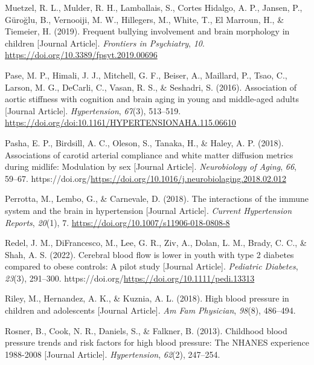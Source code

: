 \documentclass[
  letterpaper,
  DIV=11,
  numbers=noendperiod]{scrreport}
\newlength{\cslhangindent}
\newenvironment{CSLReferences}[2] %
 {\begin{list}{}{%
  \setlength{\itemindent}{0pt}
  \setlength{\leftmargin}{0pt}
  \setlength{\parsep}{0pt}
  \ifodd #1
   \setlength{\leftmargin}{\cslhangindent}
   \setlength{\itemindent}{-1\cslhangindent}
  \fi
  \setlength{\itemsep}{#2\baselineskip}}}
 {\end{list}}
\begin{document}
\begin{CSLReferences}{1}{0}
Muetzel, R. L., Mulder, R. H., Lamballais, S., Cortes Hidalgo, A. P.,
Jansen, P., Güroğlu, B., Vernooiji, M. W., Hillegers, M., White, T., El
Marroun, H., \& Tiemeier, H. (2019). Frequent bullying involvement and
brain morphology in children {[}Journal Article{]}. \emph{Frontiers in
Psychiatry}, \emph{10}. \url{https://doi.org/10.3389/fpsyt.2019.00696}

Pase, M. P., Himali, J. J., Mitchell, G. F., Beiser, A., Maillard, P.,
Tsao, C., Larson, M. G., DeCarli, C., Vasan, R. S., \& Seshadri, S.
(2016). Association of aortic stiffness with cognition and brain aging
in young and middle-aged adults {[}Journal Article{]}.
\emph{Hypertension}, \emph{67}(3), 513--519.
\url{https://doi.org/doi:10.1161/HYPERTENSIONAHA.115.06610}

Pasha, E. P., Birdsill, A. C., Oleson, S., Tanaka, H., \& Haley, A. P.
(2018). Associations of carotid arterial compliance and white matter
diffusion metrics during midlife: Modulation by sex {[}Journal
Article{]}. \emph{Neurobiology of Aging}, \emph{66}, 59--67.
https://doi.org/\url{https://doi.org/10.1016/j.neurobiolaging.2018.02.012}

Perrotta, M., Lembo, G., \& Carnevale, D. (2018). The interactions of
the immune system and the brain in hypertension {[}Journal Article{]}.
\emph{Current Hypertension Reports}, \emph{20}(1), 7.
\url{https://doi.org/10.1007/s11906-018-0808-8}

Redel, J. M., DiFrancesco, M., Lee, G. R., Ziv, A., Dolan, L. M., Brady,
C. C., \& Shah, A. S. (2022). Cerebral blood flow is lower in youth with
type 2 diabetes compared to obese controls: A pilot study {[}Journal
Article{]}. \emph{Pediatric Diabetes}, \emph{23}(3), 291--300.
https://doi.org/\url{https://doi.org/10.1111/pedi.13313}

Riley, M., Hernandez, A. K., \& Kuznia, A. L. (2018). High blood
pressure in children and adolescents {[}Journal Article{]}. \emph{Am Fam
Physician}, \emph{98}(8), 486--494.

Rosner, B., Cook, N. R., Daniels, S., \& Falkner, B. (2013). Childhood
blood pressure trends and risk factors for high blood pressure: The
NHANES experience 1988-2008 {[}Journal Article{]}. \emph{Hypertension},
\emph{62}(2), 247--254.


\end{CSLReferences}
\end{document}
